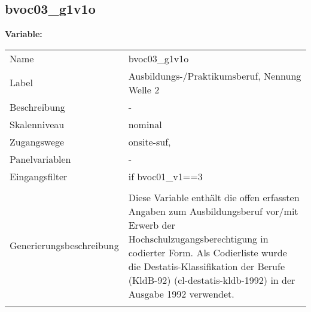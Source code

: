 	
	
	\subsection{bvoc03\_g1v1o}
	\label{subSection:bvoc03_g1v1o}

	\noindent\textbf{Variable:}\\
		\begin{tabular}{lL{11.3cm}}
			\label{tableVariable:bvoc03_g1v1o}
			Name & bvoc03\_g1v1o \\
			Label & Ausbildungs-/Praktikumsberuf, Nennung Welle 2 \\
			Beschreibung & - \\
			Skalenniveau & nominal \\
			Zugangswege &
				onsite-suf,
 \\
			Panelvariablen & -
			 \\
			Eingangsfilter & if bvoc01\_v1==3 \\
 \\
					Generierungsbeschreibung & Diese Variable enthält die offen erfassten Angaben zum Ausbildungsberuf vor/mit Erwerb der Hochschulzugangsberechtigung in codierter Form. Als Codierliste wurde die Destatis-Klassifikation der Berufe (KldB-92) (cl-destatis-kldb-1992) in der Ausgabe 1992 verwendet. 
				 \\	
			 \\
		\end{tabular}






